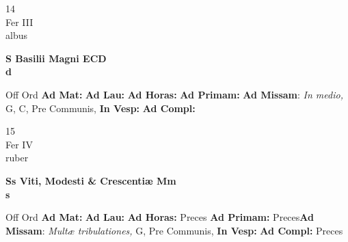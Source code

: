 \documentclass[10pt, openany]{book}
\begin{document}
    \begin{center}
        \begin{minipage}{3.5in}
            \vspace{2em}
            \begin{minipage}{0.5in}
                {\Huge 14} \\
                {\normalsize Fer III} \\
                {\normalsize albus}
            \end{minipage}
            \begin{minipage}{3.0in}
                \textbf{ \large S Basilii Magni ECD \\
                \textnormal{\normalsize d}} \\ 
            \end{minipage}
            \begin{justify}Off Ord
                \textbf{Ad Mat: }
                \textbf{Ad Lau: }
                \textbf{Ad Horas: }
                \textbf{Ad Primam: }\textbf{Ad Missam}: \textit{In medio,} G, C, Pre Communis,  
                \textbf{In Vesp: }
                \textbf{Ad Compl: }
            \end{justify}
        \end{minipage}
    \end{center}

    \begin{center}
        \begin{minipage}{3.5in}
            \vspace{2em}
            \begin{minipage}{0.5in}
                {\Huge 15} \\
                {\normalsize Fer IV} \\
                {\normalsize ruber}
            \end{minipage}
            \begin{minipage}{3.0in}
                \textbf{ \large Ss Viti, Modesti \& Crescentiæ Mm \\
                \textnormal{\normalsize s}} \\ 
            \end{minipage}
            \begin{justify}Off Ord
                \textbf{Ad Mat: }
                \textbf{Ad Lau: }
                \textbf{Ad Horas: }Preces
                \textbf{Ad Primam: }Preces\textbf{Ad Missam}: \textit{Multæ tribulationes,} G, Pre Communis,  
                \textbf{In Vesp: }
                \textbf{Ad Compl: }Preces
            \end{justify}
        \end{minipage}
    \end{center}
\end{document}
